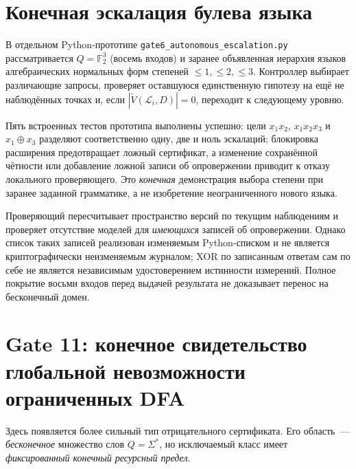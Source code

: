 \documentclass[11pt,a4paper]{article}
\newcommand{\F}{\mathbb{F}}
\newcommand{\VS}{\widetilde V}
\begin{document}
\section{Конечная эскалация булева языка}

В отдельном Python-прототипе \cite{jha2017} \texttt{gate6\_autonomous\_escalation.py} рассматривается $Q=\F_2^3$ (восемь входов) и заранее объявленная иерархия языков алгебраических нормальных форм степеней $\le1,\le2,\le3$. Контроллер выбирает различающие запросы, проверяет оставшуюся единственную гипотезу на ещё не наблюдённых точках и, если $|\VS(\mathcal L_i,D)|=0$, переходит к следующему уровню.

Пять встроенных тестов прототипа выполнены успешно: цели $x_1x_2$, $x_1x_2x_3$ и $x_1\oplus x_3$ разделяют соответственно одну, две и ноль эскалаций; блокировка расширения предотвращает ложный сертификат, а изменение сохранённой чётности или добавление ложной записи об опровержении приводит к отказу локального проверяющего. Это \emph{конечная} демонстрация выбора степени при заранее заданной грамматике, а не изобретение неограниченного нового языка.

Проверяющий пересчитывает пространство версий по текущим наблюдениям и проверяет отсутствие моделей для \emph{имеющихся} записей об опровержении. Однако список таких записей реализован изменяемым Python-списком и не является криптографически неизменяемым журналом; XOR по записанным ответам сам по себе не является независимым удостоверением истинности измерений. Полное покрытие восьми входов перед выдачей результата не доказывает перенос на бесконечный домен.

\section{Gate 11: конечное свидетельство глобальной невозможности ограниченных DFA}

Здесь появляется более сильный тип отрицательного сертификата. Его область~--- \emph{бесконечное} множество слов $Q=\Sigma^*$, но исключаемый класс имеет \emph{фиксированный конечный ресурсный предел}.
\end{document}
